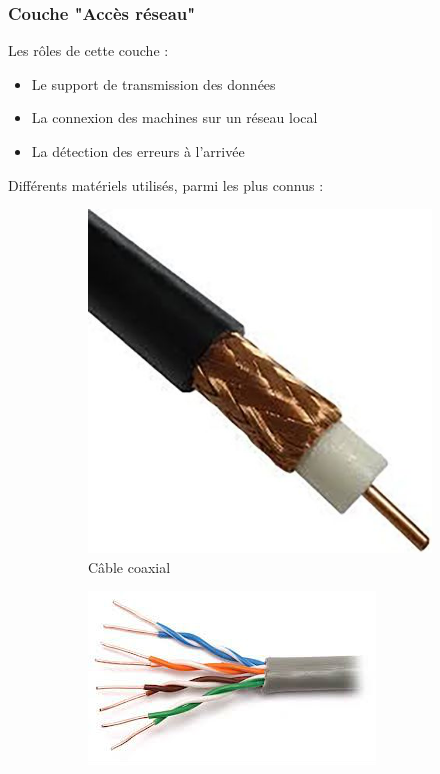 \documentclass{beamer}
\begin{document}
\begin{frame}[allowframebreaks]
\frametitle{Couche "Accès réseau"}

Les rôles de cette couche :
  \begin{itemize}
    \item Le support de transmission des données
    \item La connexion des machines sur un réseau local
    \item La détection des erreurs à l'arrivée
  \end{itemize}
  \framebreak

Différents matériels utilisés, parmi les plus connus :
\begin{figure}[h]
    \begin{subfigure}[t]{0.33\textwidth}
        \includegraphics[scale=0.6]{2-Cable_coaxial}
        \caption{Câble coaxial} 
    \end{subfigure}%
    \begin{subfigure}[t]{0.33\textwidth}
        \includegraphics[scale=0.3]{2-Paire_torsadee}

\end{subfigure}
\end{figure}
\end{frame}
\end{document}
